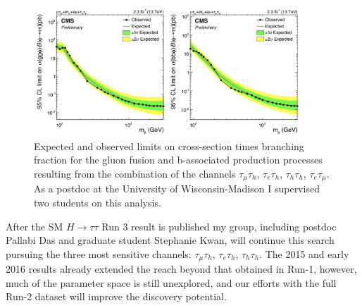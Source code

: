\documentclass[preprint,12pt]{elsarticle}
\begin{document}
\begin{figure}[htbp]
\centering
     \includegraphics[width=0.9\textwidth]{limits-mssm.png}
     \caption{Expected and observed limits on cross-section
       times branching fraction for the gluon fusion and b-associated production processes resulting from the
       combination of the channels $\tau_{\mu}\tau_{h}$, $\tau_{e}\tau_{h}$, $\tau_{h}\tau_{h}$, $\tau_{e}\tau_{\mu}$. As a postdoc
     at the University of Wisconsin-Madison I supervised two students on this analysis.}
     \label{fig:mssm_2015}
\end{figure}

After the SM $H\rightarrow\tau\tau$ Run 3 result is 
published my group, including postdoc Pallabi Das and graduate student Stephanie Kwan, will continue 
this search pursuing 
the three most sensitive channels: $\tau_{\mu}\tau_{h}$, $\tau_{e}\tau_{h}$, $\tau_{h}\tau_{h}$.
The 2015 and early 2016 results already extended the reach beyond that obtained in Run-1, however, much of the parameter space is 
still unexplored, and our efforts with the full Run-2 dataset will improve the discovery potential.
\end{document}
